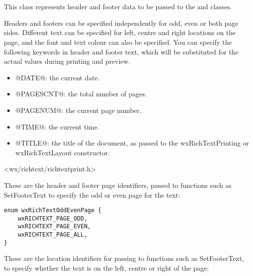 \section{}\label{wxrichtextheaderfooterdata}


This class represents header and footer data to be passed to the  and
 classes.

Headers and footers can be specified independently for odd, even or both page sides. Different text can be specified
for left, centre and right locations on the page, and the font and text colour can also
be specified. You can specify the following keywords in header and footer text, which will
be substituted for the actual values during printing and preview.

\begin{itemize}\itemsep=0pt
\item @DATE@: the current date.
\item @PAGESCNT@: the total number of pages.
\item @PAGENUM@: the current page number.
\item @TIME@: the current time.
\item @TITLE@: the title of the document, as passed to the wxRichTextPrinting or wxRichTextLayout constructor.
\end{itemize}
 



<wx/richtext/richtextprint.h>




These are the header and footer page identifiers, passed to functions such as SetFooterText to specify
the odd or even page for the text:

\begin{verbatim}
enum wxRichTextOddEvenPage {
    wxRICHTEXT_PAGE_ODD,
    wxRICHTEXT_PAGE_EVEN,
    wxRICHTEXT_PAGE_ALL,
}
\end{verbatim}

These are the location identifiers for passing to functions such as SetFooterText, to specify
whether the text is on the left, centre or right of the page:

